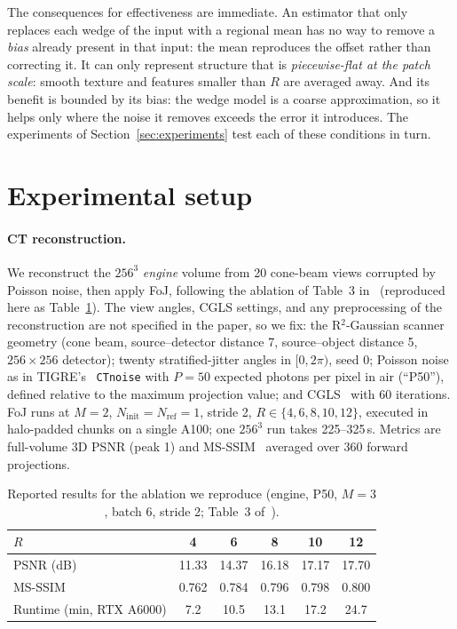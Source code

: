 \documentclass[11pt]{article}
\begin{document}
The consequences for effectiveness are immediate. An estimator that only
replaces each wedge of the input with a regional mean has no way to
remove a \emph{bias} already present in that input: the mean reproduces
the offset rather than correcting it. It can only represent structure
that is \emph{piecewise-flat at the patch scale}: smooth texture and
features smaller than $R$ are averaged away. And its benefit is bounded
by its bias: the wedge model is a coarse approximation, so it helps only
where the noise it removes exceeds the error it introduces. The
experiments of Section~\ref{sec:experiments} test each of these
conditions in turn.

\section{Experimental setup}
\label{sec:setup}

\paragraph{CT reconstruction.}
We reconstruct the $256^3$ \emph{engine} volume from 20 cone-beam views
corrupted by Poisson noise, then apply FoJ, following the ablation of
Table~3 in~\cite{moeini2026foj3d} (reproduced here as
Table~\ref{tab:paper}). The view angles, CGLS settings, and any
preprocessing of the reconstruction are not specified in the paper, so we
fix: the R$^2$-Gaussian scanner geometry (cone beam, source--detector
distance 7, source--object distance 5, $256\times256$ detector); twenty
stratified-jitter angles in $[0,2\pi)$, seed 0; Poisson noise as in
TIGRE's~\cite{biguri2016tigre} \texttt{CTnoise} with $P{=}50$ expected
photons per pixel in air
(``P50''), defined relative to the maximum projection value; and
CGLS~\cite{hestenes1952cg} with 60 iterations. FoJ runs at $M{=}2$,
$N_{\text{init}}{=}N_{\text{ref}}{=}1$, stride 2,
$R\in\{4,6,8,10,12\}$, executed in halo-padded chunks on a single A100;
one $256^3$ run takes 225--325\,s. Metrics are full-volume 3D PSNR (peak
1) and MS-SSIM~\cite{wang2003msssim} averaged over 360 forward
projections.

\begin{table}[t]
\centering
\caption{Reported results for the ablation we reproduce (engine, P50,
$M{=}3$, batch 6, stride 2; Table~3 of~\cite{moeini2026foj3d}).}
\label{tab:paper}
\begin{tabular}{lccccc}
\toprule
$R$ & 4 & 6 & 8 & 10 & 12 \\
\midrule
PSNR (dB) & 11.33 & 14.37 & 16.18 & 17.17 & 17.70 \\
MS-SSIM   & 0.762 & 0.784 & 0.796 & 0.798 & 0.800 \\
Runtime (min, RTX A6000) & 7.2 & 10.5 & 13.1 & 17.2 & 24.7 \\
\bottomrule
\end{tabular}
\end{table}
\end{document}
